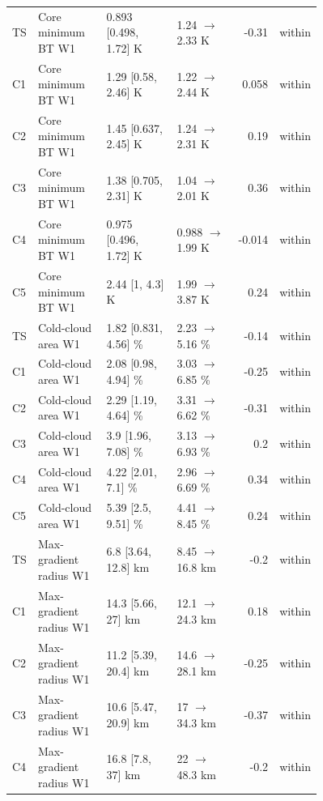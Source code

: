 \tabletail{\hline}
\begin{supertabular}{p{0.055\linewidth}p{0.23\linewidth}p{0.25\linewidth}p{0.22\linewidth}rr}
TS & Core minimum BT W1 & 0.893 [0.498, 1.72] K & 1.24 $\rightarrow$ 2.33 K & -0.31 & within \\
C1 & Core minimum BT W1 & 1.29 [0.58, 2.46] K & 1.22 $\rightarrow$ 2.44 K & 0.058 & within \\
C2 & Core minimum BT W1 & 1.45 [0.637, 2.45] K & 1.24 $\rightarrow$ 2.31 K & 0.19 & within \\
C3 & Core minimum BT W1 & 1.38 [0.705, 2.31] K & 1.04 $\rightarrow$ 2.01 K & 0.36 & within \\
C4 & Core minimum BT W1 & 0.975 [0.496, 1.72] K & 0.988 $\rightarrow$ 1.99 K & -0.014 & within \\
C5 & Core minimum BT W1 & 2.44 [1, 4.3] K & 1.99 $\rightarrow$ 3.87 K & 0.24 & within \\
TS & Cold-cloud area W1 & 1.82 [0.831, 4.56] \% & 2.23 $\rightarrow$ 5.16 \% & -0.14 & within \\
C1 & Cold-cloud area W1 & 2.08 [0.98, 4.94] \% & 3.03 $\rightarrow$ 6.85 \% & -0.25 & within \\
C2 & Cold-cloud area W1 & 2.29 [1.19, 4.64] \% & 3.31 $\rightarrow$ 6.62 \% & -0.31 & within \\
C3 & Cold-cloud area W1 & 3.9 [1.96, 7.08] \% & 3.13 $\rightarrow$ 6.93 \% & 0.2 & within \\
C4 & Cold-cloud area W1 & 4.22 [2.01, 7.1] \% & 2.96 $\rightarrow$ 6.69 \% & 0.34 & within \\
C5 & Cold-cloud area W1 & 5.39 [2.5, 9.51] \% & 4.41 $\rightarrow$ 8.45 \% & 0.24 & within \\
TS & Max-gradient radius W1 & 6.8 [3.64, 12.8] km & 8.45 $\rightarrow$ 16.8 km & -0.2 & within \\
C1 & Max-gradient radius W1 & 14.3 [5.66, 27] km & 12.1 $\rightarrow$ 24.3 km & 0.18 & within \\
C2 & Max-gradient radius W1 & 11.2 [5.39, 20.4] km & 14.6 $\rightarrow$ 28.1 km & -0.25 & within \\
C3 & Max-gradient radius W1 & 10.6 [5.47, 20.9] km & 17 $\rightarrow$ 34.3 km & -0.37 & within \\
C4 & Max-gradient radius W1 & 16.8 [7.8, 37] km & 22 $\rightarrow$ 48.3 km & -0.2 & within \\

\end{supertabular}
